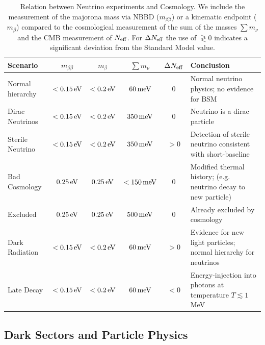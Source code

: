 \begin{table}[t!]
\begin{center}
\begin{tabular}
{| l | c c c c | p{5cm} | }\hline Scenario & $m_{\beta \beta}$ & $m_{\beta}$&  $\sum m_\nu$ & $\Delta N_{\rm eff}$ & Conclusion \\
\hline 
Normal hierarchy & $< 0.15 \, {\rm eV}$ & $< 0.2 \,  {\rm eV}$  & $60 \, {\rm meV}$ & 0 & Normal neutrino physics; no evidence for BSM
\\  
Dirac Neutrinos & $< 0.15 \, {\rm eV}$ & $ <0.2 \, {\rm eV}$  & $350  \, {\rm meV}$ & 0 & Neutrino is a dirac particle \\
Sterile Neutrino & $< 0.15 \, {\rm eV}$ & $ <0.2 \, {\rm eV}$   & $350  \, {\rm meV}$ & $>0$ & Detection of sterile neutrino consistent with short-baseline \\
\hline
Bad Cosmology & $ 0.25 \, {\rm eV}$ & $ 0.25 \, {\rm eV}$  & $<150  \, {\rm meV}$ & $0$ & Modified thermal history; (e.g. neutrino decay to new particle) \\
Excluded & $ 0.25 \, {\rm eV}$ & $ 0.25 \, {\rm eV}$  & $500  \, {\rm meV}$ & $0$ & Already excluded by cosmology \\
\hline
Dark Radiation & $< 0.15 \, {\rm eV}$ & $ <0.2 \, {\rm eV}$  & $60  \, {\rm meV}$ & $>0$ & Evidence for new light particles; normal hierarchy for neutrinos
\\  
Late Decay & $< 0.15 \, {\rm eV}$ & $ <0.2 \, {\rm eV}$  & $60  \, {\rm meV}$ & $<0$ & Energy-injection into photons at temperature $T \lesssim 1$ MeV \\
\hline 
\end{tabular}
\caption{Relation between Neutrino experiments and Cosmology.  We include the measurement of the majorona mass via NBBD ($m_{\beta \beta}$) or a kinematic endpoint ($m_\beta$) compared to the cosmological measurement of the sum of the masses $\sum m_\nu$ and the CMB measurement of $N_{\rm eff}$.  For $\Delta N_{\rm eff}$ the use of $\gtrless 0$ indicates a significant deviation from the Standard Model value.}
\label{table:neutrinoscenarios}
\end{center}
\end{table} 

\subsection{Dark Sectors and Particle Physics}

